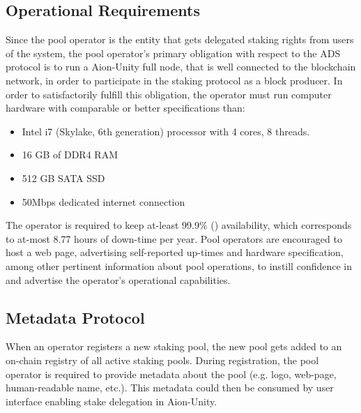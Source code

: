 \subsection{Operational Requirements} \label{operator_requirements}
Since the pool operator is the entity that gets delegated staking rights from users of the system, the pool operator's primary obligation with respect to the ADS protocol is to run a Aion-Unity full node, that is well connected to the blockchain network, in order to participate in the staking protocol as a block producer. In order to satisfactorily fulfill this obligation, the operator must run computer hardware with comparable or better specifications than:
\begin{itemize}
    \item Intel i7 (Skylake, 6th generation) processor with 4 cores, 8 threads.
    \item 16 GB of DDR4 RAM 
    \item 512 GB SATA SSD
    \item 50Mbps dedicated internet connection  
\end{itemize}
The operator is required to keep at-least 99.9\% () availability, which corresponds to at-most 8.77 hours of down-time per year. Pool operators are encouraged to host a web page, advertising self-reported up-times and hardware specification, among other pertinent information about pool operations, to instill confidence in and advertise the operator's operational capabilities. 

\subsection{Metadata Protocol} \label{metadata_protocol}
When an operator registers a new staking pool, the new pool gets added to an on-chain registry of all active staking pools. During registration, the pool operator is required to provide metadata about the pool (e.g. logo, web-page, human-readable name, etc.). This metadata could then be consumed by user interface enabling stake delegation in Aion-Unity. 


